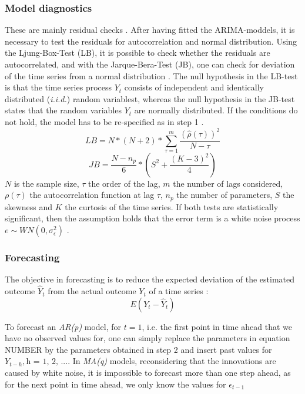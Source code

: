 \documentclass[a4paper, 11pt]{article}
\begin{document}
\subsubsection{Model diagnostics}
These are mainly residual checks \citep{Arlt.2017}. After having fitted the ARIMA-moddels, it is necessary to test the residuals for autocorrelation and normal distribution. Using the Ljung-Box-Test (LB), it is possible to check whether the residuals are autocorrelated, and with the Jarque-Bera-Test (JB), one can check for deviation of the time series from a normal distribution  \citep{Andreoni.2006b}. The null hypothesis in the LB-test is that the time series process $Y_{t}$ consists of independent and identically distributed (\textit{i.i.d.}) random variablest, whereas the null hypothesis in the JB-test states that the random variables $Y_{t}$ are normally distributed. If the conditions do not hold, the model has to be re-specified as in step 1 \citep{Vogel.2015}. \\
\begin{equation}
	LB = N *(N + 2) * \sum_{\tau = 1}^{m}\frac{(\hat{\rho}(\tau))^2}{N - \tau}
\end{equation}
\begin{equation}
	JB = \frac{N - n_{p}}{6}*(S^2 + \frac{(K - 3)^2}{4})
\end{equation}
$N$ is the sample size, $\tau$ the order of the lag, $m$ the number of lags considered, $\rho(\tau)$ the autocorrelation function at lag $\tau$, $n_{p}$ the number of parameters, $S$ the skewness and $K$ the curtosis of the time series. If both tests are statistically significant, then the assumption holds that the error term is a white noise process $e \sim  WN(0, \sigma_{\epsilon}^2)$ \citep{Intihar.2017}.\\

\subsubsection{Forecasting}
The objective in forecasting is to reduce the expected deviation of the estimated outcome $\hat{Y}_{t}$ from the actual outcome $Y_{t}$ of a time series \citep{Falk.2012}:
\begin{equation}
	E(Y_{t} - \hat{Y}_{t})
\end{equation}

To forecast an \textit{AR(p)} model, for $t = 1$, i.e. the first point in time ahead that we have no observed values for, one can simply replace the parameters in equation NUMBER by the parameters obtained in step 2 and insert past values for $Y_{t-h}, \text{h = 1, 2, ...}$.  
In \textit{MA(q)} models, reconsidering that the innovations are caused by white noise, it is impossible to forecast more than one step ahead, as for the next point in time ahead, we only know the values for $\epsilon_{t-1}$
\end{document}
